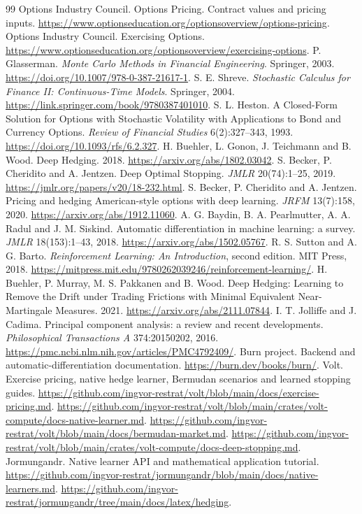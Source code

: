 \documentclass[8pt]{strategynet-journal}
\begin{document}
\begin{SNcolumns}
\begin{thebibliography}{99}
 Options Industry Council. Options Pricing. Contract values and pricing inputs. \url{https://www.optionseducation.org/optionsoverview/options-pricing}.
 Options Industry Council. Exercising Options. \url{https://www.optionseducation.org/optionsoverview/exercising-options}.
 P. Glasserman. \emph{Monte Carlo Methods in Financial Engineering}. Springer, 2003. \url{https://doi.org/10.1007/978-0-387-21617-1}.
 S. E. Shreve. \emph{Stochastic Calculus for Finance II: Continuous-Time Models}. Springer, 2004. \url{https://link.springer.com/book/9780387401010}.
 S. L. Heston. A Closed-Form Solution for Options with Stochastic Volatility with Applications to Bond and Currency Options. \emph{Review of Financial Studies} 6(2):327--343, 1993. \url{https://doi.org/10.1093/rfs/6.2.327}.
 H. Buehler, L. Gonon, J. Teichmann and B. Wood. Deep Hedging. 2018. \url{https://arxiv.org/abs/1802.03042}.
 S. Becker, P. Cheridito and A. Jentzen. Deep Optimal Stopping. \emph{JMLR} 20(74):1--25, 2019. \url{https://jmlr.org/papers/v20/18-232.html}.
 S. Becker, P. Cheridito and A. Jentzen. Pricing and hedging American-style options with deep learning. \emph{JRFM} 13(7):158, 2020. \url{https://arxiv.org/abs/1912.11060}.
 A. G. Baydin, B. A. Pearlmutter, A. A. Radul and J. M. Siskind. Automatic differentiation in machine learning: a survey. \emph{JMLR} 18(153):1--43, 2018. \url{https://arxiv.org/abs/1502.05767}.
 R. S. Sutton and A. G. Barto. \emph{Reinforcement Learning: An Introduction}, second edition. MIT Press, 2018. \url{https://mitpress.mit.edu/9780262039246/reinforcement-learning/}.
 H. Buehler, P. Murray, M. S. Pakkanen and B. Wood. Deep Hedging: Learning to Remove the Drift under Trading Frictions with Minimal Equivalent Near-Martingale Measures. 2021. \url{https://arxiv.org/abs/2111.07844}.
 I. T. Jolliffe and J. Cadima. Principal component analysis: a review and recent developments. \emph{Philosophical Transactions A} 374:20150202, 2016. \url{https://pmc.ncbi.nlm.nih.gov/articles/PMC4792409/}.
 Burn project. Backend and automatic-differentiation documentation. \url{https://burn.dev/books/burn/}.
 Volt. Exercise pricing, native hedge learner, Bermudan scenarios and learned stopping guides. \url{https://github.com/ingvor-restrat/volt/blob/main/docs/exercise-pricing.md}. \url{https://github.com/ingvor-restrat/volt/blob/main/crates/volt-compute/docs-native-learner.md}. \url{https://github.com/ingvor-restrat/volt/blob/main/docs/bermudan-market.md}. \url{https://github.com/ingvor-restrat/volt/blob/main/crates/volt-compute/docs-deep-stopping.md}.
 Jormungandr. Native learner API and mathematical application tutorial. \url{https://github.com/ingvor-restrat/jormungandr/blob/main/docs/native-learners.md}. \url{https://github.com/ingvor-restrat/jormungandr/tree/main/docs/latex/hedging}.
\end{thebibliography}
\end{SNcolumns}
\end{document}
